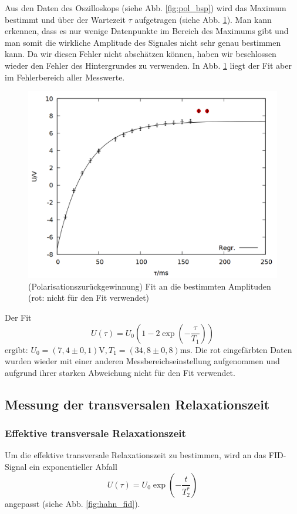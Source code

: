 Aus den Daten des Oszilloskops (siehe Abb. \ref{fig:pol_bsp}) wird das Maximum bestimmt und über der Wartezeit $\tau$ aufgetragen (siehe Abb. \ref{fig:pol_data}). Man kann erkennen, dass es nur wenige Datenpunkte im Bereich des Maximums gibt und man somit die wirkliche Amplitude des Signales nicht sehr genau bestimmen kann. Da wir diesen Fehler nicht abschätzen können, haben wir beschlossen wieder den Fehler des Hintergrundes zu verwenden. In Abb. \ref{fig:pol_data} liegt der Fit aber im Fehlerbereich aller Messwerte.
\begin{figure}[h]
\centering
\includegraphics[width=0.75\linewidth]{data/p402_443_data/polarisationszurueckgewinnung/out_pol.png}
\caption{(Polarisationszurückgewinnung) Fit an die bestimmten Amplituden (rot: nicht für den Fit verwendet)}
\label{fig:pol_data}
\end{figure}

Der Fit $$U(\tau) = U_0\left(1-2\exp{\left(-\frac{\tau}{T_1}\right)}\right)$$ ergibt: $U_0 = (7,4\pm 0,1)\si{\volt}, T_1 = (34,8\pm 0,8) \si{\milli\second}$. Die rot eingefärbten Daten wurden wieder mit einer anderen Messbereichseinstellung aufgenommen und aufgrund ihrer starken Abweichung nicht für den Fit verwendet. 

\subsection{Messung der transversalen Relaxationszeit}
\subsubsection{Effektive transversale Relaxationszeit}
Um die effektive transversale Relaxationszeit zu bestimmen, wird an das FID-Signal ein exponentieller Abfall $$U(\tau) = U_0\exp{\left(-\frac{t}{T_2^*}\right)}$$ angepasst (siehe Abb. \ref{fig:hahn_fid}).

